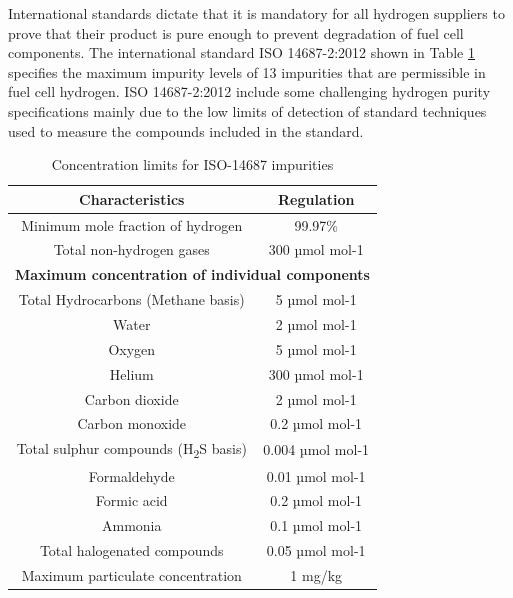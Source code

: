 International standards dictate that it is mandatory for all hydrogen suppliers to prove that their 
product is pure enough to prevent degradation of fuel cell components. The international standard ISO
14687-2:2012 \cite{InternationalStandardISO14687-2:20122012} shown in Table \ref{tab:1} specifies the maximum impurity levels of 13 impurities that are 
permissible in fuel cell hydrogen. ISO 14687-2:2012 include some challenging hydrogen purity 
specifications mainly due to the low limits of detection of standard techniques used to measure the 
compounds included in the standard. 

\begin{table}[]
    \caption{Concentration limits for ISO-14687 impurities}
    \centering
    \begin{tabular}{@{}cc@{}}
    \toprule
    \textbf{Characteristics}                  & \textbf{Regulation}    \\ \midrule
    Minimum mole fraction of hydrogen         & 99.97\%                \\
    Total non-hydrogen gases                  & 300 µmol mol-1         \\ \midrule
    \multicolumn{2}{c}{\textbf{Maximum concentration of individual components}} \\ \midrule
    Total Hydrocarbons (Methane basis)        & 5 µmol mol-1           \\
    Water                                     & 2 µmol mol-1           \\
    Oxygen                                    & 5 µmol mol-1           \\
    Helium                                    & 300 µmol mol-1         \\
    Carbon dioxide                            & 2 µmol mol-1           \\
    Carbon monoxide                           & 0.2 µmol mol-1         \\
    Total sulphur compounds (H\textsubscript{2}S basis)       & 0.004 µmol mol-1       \\
    Formaldehyde                              & 0.01 µmol mol-1        \\
    Formic acid                               & 0.2 µmol mol-1         \\
    Ammonia                                   & 0.1 µmol mol-1         \\
    Total halogenated compounds               & 0.05 µmol mol-1        \\
    Maximum particulate concentration         & 1 mg/kg                \\ \bottomrule
    \end{tabular}
    \label{tab:1}
\end{table}

